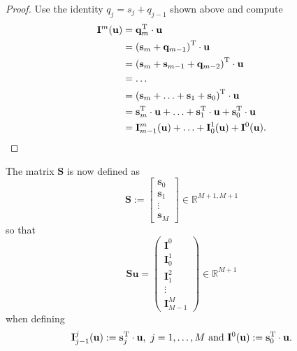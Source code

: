 \documentclass[11pt]{article}
\newcommand{\Tt}[1]{\mathbf{#1}}
\begin{document}
\begin{proof}
Use the identity $q_{j} = s_{j} + q_{j-1}$ shown above and compute
\begin{align}
	\Tt{I}^{m}(\Tt{u}) &= \Tt{q}_{m}^{\rm T} \cdot \Tt{u} \\
				 &= \left( \Tt{s}_{m} + \Tt{q}_{m-1} \right)^{\rm T} \cdot \Tt{u} \\
				 &= \left( \Tt{s}_{m} + \Tt{s}_{m-1} + \Tt{q}_{m-2} \right)^{\rm T} \cdot \Tt{u} \\
				 &= \ldots \\
				 &= \left( \Tt{s}_{m} + \ldots + \Tt{s}_{1} + \Tt{s}_{0} \right)^{\rm T} \cdot \Tt{u} \\
				 &= \Tt{s}_{m}^{\rm T} \cdot \Tt{u} + \ldots + \Tt{s}_{1}^{\rm T} \cdot \Tt{u} + \Tt{s}_{0}^{\rm T} \cdot \Tt{u} \\
				 &= \Tt{I}_{m-1}^{m}(\Tt{u}) + \ldots + \Tt{I}_{0}^{1}(\Tt{u}) + \Tt{I}^{0}(\Tt{u}).
\end{align}
\end{proof}
The matrix $\Tt{S}$ is now defined as
\begin{equation}
	\Tt{S} := \begin{bmatrix} \Tt{s}_{0} \\ \Tt{s}_{1} \\ \vdots \\ \Tt{s}_{M} \end{bmatrix} \in \mathbb{R}^{M+1, M+1}
\end{equation}
so that
\begin{equation}
	\Tt{S} \Tt{u} = \begin{pmatrix} \Tt{I}^{0} \\ \Tt{I}_{0}^{1} \\ \Tt{I}_{1}^{2} \\ \vdots \\ \Tt{I}_{M-1}^{M} \end{pmatrix} \in \mathbb{R}^{M+1}
\end{equation}
when defining
\begin{equation}
	\Tt{I}_{j-1}^{j}(\Tt{u}) := \Tt{s}_{j}^{\rm T} \cdot \Tt{u}, \ j=1,\ldots,M \ \text{and} \ \Tt{I}^{0}(\Tt{u}) := \Tt{s}_{0}^{\rm T} \cdot \Tt{u}.
\end{equation}
\end{document}
